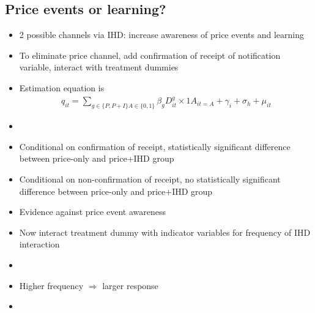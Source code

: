 \documentclass[12pt]{article}
\begin{document}
\subsection{Price events or learning?}
\begin{itemize}
    \item 2 possible channels via IHD: increase awareness of price events and learning
    \item To eliminate price channel, add confirmation of receipt of notification variable, interact with treatment dummies
    \item Estimation equation is
        \begin{align*}
            q _ { i t } = \sum _ { g \in \{ P , P + I \} A \in \{ 0,1 \} } \beta _ { g } D _ { i t } ^ { g } \times 1 A _ { i t = A }  + \gamma _ { i } + \sigma _ { h } + \mu _ { i t }
        \end{align*}
    \item {}
    \item Conditional on confirmation of receipt, statistically significant difference between price-only and price+IHD group
    \item Conditional on non-confirmation of receipt, no statistically significant difference between price-only and price+IHD group
    \item Evidence against price event awareness
    \item Now interact treatment dummy with indicator variables for frequency of IHD interaction
    \item {}
    \item Higher frequency $\Rightarrow$ larger response
    \item 
\end{itemize}
\end{document}
